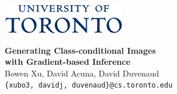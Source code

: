 \documentclass[landscape,a0b,final,a4resizeable]{include/a0poster}
\begin{document}
\begin{poster}
\begin{center}
\begin{pcolumn}{0.99}
{\begin{minipage}[c][][b]{\logowidth}
      \includegraphics{badges/uot_text.png}
\end{minipage}
%
%
\begin{minipage}[c][9cm][c]{0.9\textwidth}
  \begin{center}
    \vspace{3.5cm}
    {\sffamily \VeryHuge \textbf{Generating Class-conditional Images\\\vspace{5.0mm} with Gradient-based Inference}}\\[10mm]
    {\huge\sffamily \Huge Bowen Xu, David Acuna, David Duvenaud\\[7.5mm]
    \Large \texttt{\{xubo3, davidj, duvenaud\}@cs.toronto.edu}
    }
  \end{center}
\end{minipage}
%
%
% 
%

}
\end{pcolumn}
\end{center}
\end{poster}
\end{document}
